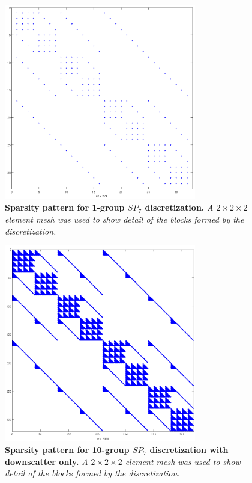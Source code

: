\begin{figure}[t!]
  \begin{center}
    \includegraphics[width=3.3in]{chapters/spn_equations/group1.png}
  \end{center}
  \caption{\textbf{Sparsity pattern for 1-group $SP_7$
      discretization.} \textit{A $2\times 2 \times 2$ element mesh was
      used to show detail of the blocks formed by the discretization.}}
  \label{fig:group1}
\end{figure}
\begin{figure}[t!]
  \begin{center}
    \includegraphics[width=3.3in]{chapters/spn_equations/group10ds.png}
  \end{center}
  \caption{\textbf{Sparsity pattern for 10-group $SP_7$ discretization
      with downscatter only.} \textit{A $2\times 2 \times 2$ element
      mesh was used to show detail of the blocks formed by the
      discretization.}}
  \label{fig:group10ds}
\end{figure}
